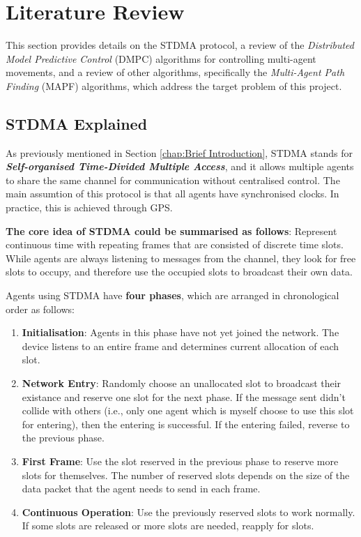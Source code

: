 \chapter{Literature Review} 
\label{chap:Literature_Review}

This section provides details on the STDMA\cite{STDMA} protocol, a review of the \textit{Distributed Model Predictive Control} (DMPC) algorithms for controlling multi-agent movements, 
and a review of other algorithms, specifically the \textit{Multi-Agent Path Finding} (MAPF) algorithms, which address the target problem of this project.
\section{STDMA Explained}

\label{chap:STDMA Explained}

As previously mentioned in Section \ref{chap:Brief Introduction}, STDMA stands for \textbf{\textit{Self-organised Time-Divided Multiple Access}}, and it allows multiple agents to share the same channel for communication without centralised control.
The main assumtion of this protocol is that all agents have synchronised clocks. In practice, this is achieved through GPS\cite{STDMA_GPS}.

\textbf{The core idea of STDMA could be summarised as follows}: Represent continuous time with repeating frames that are consisted of discrete time slots.
While agents are always listening to messages from the channel, they look for free slots to occupy, and therefore use the occupied slots to broadcast their own data.

Agents using STDMA have \textbf{four phases}, which are arranged in chronological order as follows:

\begin{enumerate}
  \item \textbf{Initialisation}: Agents in this phase have not yet joined the network. The device listens to an entire frame and determines current allocation of each slot.
  \item \textbf{Network Entry}: Randomly choose an unallocated slot to broadcast their existance and reserve one slot for the next phase.  If the message sent didn't collide with others (i.e., only one agent which is myself choose to use this slot for entering), then the entering is successful. If the entering failed, reverse to the previous phase.
  \item \textbf{First Frame}: Use the slot reserved in the previous phase to reserve more slots for themselves. The number of reserved slots depends on the size of the data packet that the agent needs to send in each frame.
  \item \textbf{Continuous Operation}: Use the previously reserved slots to work normally. If some slots are released or more slots are needed, reapply for slots.
\end{enumerate}

